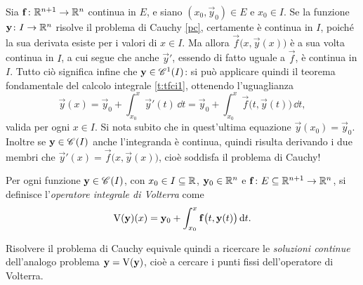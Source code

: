 Sia $\vec f\colon\R^{n+1}\to\R^n$ continua in $E$, e siano $(x_0,\vec y_0)\in E$ e $x_0\in I$. Se la funzione $\vec y\colon I\to\R^n$ risolve il problema di Cauchy \eqref{pc}, certamente è continua in $I$, poiché la sua derivata esiste per i valori di $x\in I$. Ma allora $\vec f\big(x,\vec y(x)\big)$ è a sua volta continua in $I$, a cui segue che anche $\vec y'$, essendo di fatto uguale a $\vec f$, è continua in $I$. Tutto ciò significa infine che $\vec y\in\cont[1]{I}$: si può applicare quindi il teorema fondamentale del calcolo integrale \ref{t:tfci1}, ottenendo l'uguaglianza
\begin{equation}
\vec y(x)=\vec y_0+\int_{x_0}^x\vec y'(t)\,\dd t=\vec y_0+\int_{x_0}^x\vec f\big(t,\vec y(t)\big)\,\dd t,
\end{equation}
valida per ogni $x\in I$.
Si nota subito che in quest'ultima equazione $\vec y(x_0)=\vec y_0$. Inoltre se $\vec y\in\cont{I}$ anche l'integranda è continua, quindi risulta derivando i due membri che $\vec y'(x)=\vec f\big(x,\vec y(x)\big)$, cioè soddisfa il problema di Cauchy!

\begin{definizione} \label{d:volterra}
Per ogni funzione $\vec y\in\cont{I}$, con $x_0\in I\subseteq\R$, $\vec y_0\in\R^n$ e $\vec f\colon E\subseteq\R^{n+1}\to\R^n$, si definisce l'\emph{operatore integrale di Volterra} come
\begin{equation} \label{vol}
\volterra(\vec y)(x)=\vec y_0+\int_{x_0}^x\vec f\big(t,\vec y(t)\big)\,\dd t.
\end{equation}
\end{definizione}
Risolvere il problema di Cauchy equivale quindi a ricercare le \emph{soluzioni continue} dell'analogo problema $\vec y=\volterra(\vec y)$, cioè a cercare i punti fissi dell'operatore di Volterra.

